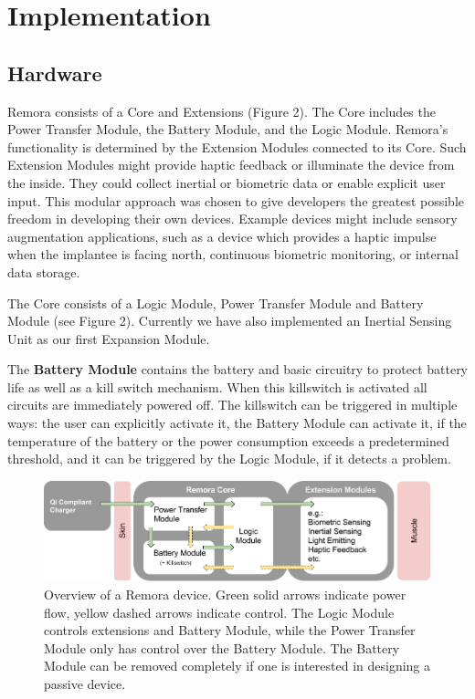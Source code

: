 \documentclass[runningheads,a4paper]{llncs}
\begin{document}
\section{Implementation}
\subsection{Hardware}
Remora consists of a Core and Extensions (Figure 2). The Core includes the Power Transfer Module, the Battery Module, and the Logic Module. Remora’s functionality is determined by the Extension Modules connected to its Core. Such Extension Modules might provide haptic feedback or illuminate the device from the inside. They could collect inertial or biometric data or enable explicit user input. This modular approach was chosen to give developers the greatest possible freedom in developing their own devices. Example devices might include sensory augmentation applications, such as a device which provides a haptic impulse when the implantee is facing north, continuous biometric monitoring, or internal data storage. 

The Core consists of a Logic Module, Power Transfer Module and Battery Module (see Figure 2). Currently we have also implemented an Inertial Sensing Unit as our first Expansion Module.

The \textbf{Battery Module} contains the battery and basic circuitry to protect battery life as well as a kill switch mechanism. When this killswitch is activated all circuits are immediately powered off. The killswitch can be triggered in multiple ways: the user can explicitly activate it, the Battery Module can activate it, if the temperature of the battery or the power consumption exceeds a predetermined threshold, and it can be triggered by the Logic Module, if it detects a problem.
\begin{figure}
 \includegraphics[scale=0.375]{hardware}
 
\caption{Overview of a Remora device. Green solid arrows indicate power flow, yellow dashed arrows indicate control. The Logic Module controls extensions and Battery Module, while the Power Transfer Module only has control over the Battery Module. The Battery Module can be removed completely if one is interested in designing a passive device.}
\end{figure}
\end{document}
